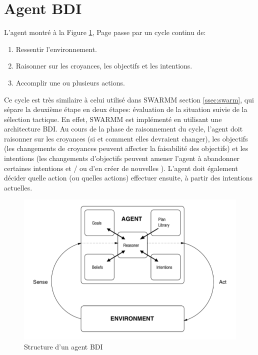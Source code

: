 \section{Agent BDI}

L'agent montré à la Figure \ref{fig:bdi}, Page \pageref{fig:bdi} passe par un cycle continu de:

\begin{enumerate}
\item Ressentir l'environnement.
\item Raisonner sur les croyances, les objectifs et les intentions.
\item Accomplir une ou plusieurs actions.
\end{enumerate}

Ce cycle est très similaire à celui utilisé dans SWARMM section \ref{ssec:swarm}, qui sépare la deuxième étape en deux étapes: évaluation de la situation suivie de la sélection tactique. En effet, SWARMM est implémenté en utilisant une architecture BDI. Au cours de la phase de raisonnement du cycle, l'agent doit raisonner sur les croyances (si et comment elles devraient changer), les objectifs (les changements de croyances peuvent affecter la faisabilité des objectifs) et les intentions (les changements d'objectifs peuvent amener l'agent à abandonner certaines intentions et / ou d’en créer de nouvelles ). L'agent doit également décider quelle action (ou quelles actions) effectuer ensuite, à partir des intentions actuelles.


\begin{figure}[th]
\centering
\includegraphics{Figures/bdi.PNG}
\decoRule
\caption[ Structure d’un agent BDI ] { Structure d’un agent BDI }
\label{fig:bdi}
\end{figure}



